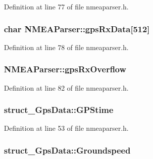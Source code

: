 Definition at line 77 of file nmeaparser.\-h.

\hypertarget{group___g_p_s_gadget_plugin_gaef781170a93672b3bbc887fcabdcb369}{
\subsubsection[{gps\-Rx\-Data}]{\setlength{\rightskip}{0pt plus 5cm}char N\-M\-E\-A\-Parser\-::gps\-Rx\-Data\mbox{[}512\mbox{]}}}\label{group___g_p_s_gadget_plugin_gaef781170a93672b3bbc887fcabdcb369}


Definition at line 78 of file nmeaparser.\-h.

\hypertarget{group___g_p_s_gadget_plugin_gaf0b70b48a4a5943f40dc14c11b8e0712}{
\subsubsection[{gps\-Rx\-Overflow}]{ N\-M\-E\-A\-Parser\-::gps\-Rx\-Overflow}}\label{group___g_p_s_gadget_plugin_gaf0b70b48a4a5943f40dc14c11b8e0712}


Definition at line 82 of file nmeaparser.\-h.

\hypertarget{group___g_p_s_gadget_plugin_gaeedda11a0db9fe353ca149906deccb9f}{
\subsubsection[{G\-P\-Stime}]{ struct\-\_\-\-Gps\-Data\-::\-G\-P\-Stime}}\label{group___g_p_s_gadget_plugin_gaeedda11a0db9fe353ca149906deccb9f}


Definition at line 53 of file nmeaparser.\-h.

\hypertarget{group___g_p_s_gadget_plugin_ga96522460814507cd49570c6edbecdc4a}{
\subsubsection[{Groundspeed}]{ struct\-\_\-\-Gps\-Data\-::\-Groundspeed}}\label{group___g_p_s_gadget_plugin_ga96522460814507cd49570c6edbecdc4a}


